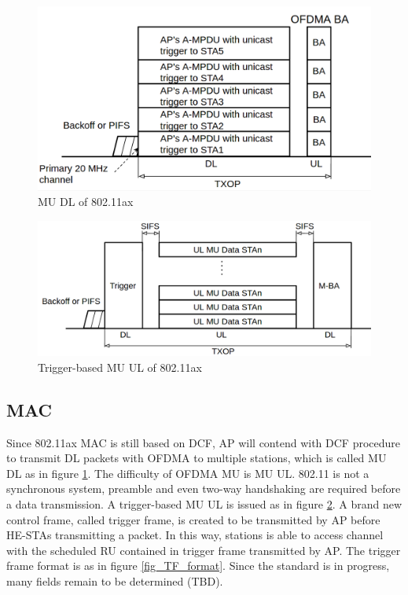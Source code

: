 \begin{figure}[!t]
\includegraphics[scale=0.4]{./figure/chp2/fig_MU_DL.png}
\caption{MU DL of 802.11ax}
\label{fig_MU_DL}
\end{figure}


\begin{figure}[!t]
\includegraphics[scale=0.36]{./figure/chp2/fig_MU_UL.png}
\caption{Trigger-based MU UL of 802.11ax}
\label{fig_MU_UL}
\end{figure}


\subsection{MAC}
Since 802.11ax MAC is still based on DCF, AP will contend with DCF procedure to transmit DL packets with OFDMA to multiple stations, which is called MU DL as in figure \ref{fig_MU_DL}. 
The difficulty of OFDMA MU is MU UL. 
802.11 is not a synchronous system, preamble and even two-way handshaking are required before a data transmission. 
A trigger-based MU UL is issued as in figure \ref{fig_MU_UL}.
A brand new control frame, called trigger frame, is created to be transmitted by AP before HE-STAs transmitting a packet. 
In this way, stations is able to access channel with the scheduled RU contained in trigger frame transmitted by AP. 
The trigger frame format is as in figure \ref{fig_TF_format}. Since the standard is in progress, many fields remain to be determined (TBD). 

